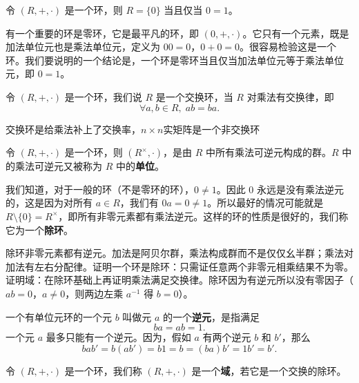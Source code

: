 \begin{proposition}[命题 2.2：零环，加法单位元与乘法单位元相等]
令 $(R,+,\cdot)$ 是一个环，则 $R=\{0\}$ 当且仅当 $0=1$。

有一个重要的环是零环，它是最平凡的环，即 $(0,+,\cdot)$。它只有一个元素，既是加法单位元也是乘法单位元，定义为 $00=0$，$0+0=0$。很容易检验这是一个环。我们要说明的一个结论是，一个环是零环当且仅当加法单位元等于乘法单位元，即 $0=1$。
\end{proposition}

\begin{definition}[定义 2.2：交换环]
令 $(R,+,\cdot)$ 是一个环，我们说 $R$ 是一个交换环，当 $R$ 对乘法有交换律，即
\[
\forall a,b\in R,\;ab=ba.
\]
\end{definition}

\begin{note}[定义2 2交换环]
交换环是给乘法补上了交换率，$n\times n$实矩阵是一个非交换环
\end{note}

\begin{definition}[定义 2.3：单位与除环]
令 $(R,+,\cdot)$ 是一个环，则 $(R^\times,\cdot)$，是由 $R$ 中所有乘法可逆元构成的群。$R$ 中的乘法可逆元又被称为 $R$ 中的\textbf{单位}。

我们知道，对于一般的环（不是零环的环），$0\ne 1$。因此 $0$ 永远是没有乘法逆元的，这是因为对所有 $a\in R$，我们有 $0a=0\ne 1$。所以最好的情况可能就是 $R\setminus\{0\}=R^\times$，即所有非零元素都有乘法逆元。这样的环的性质是很好的，我们称它为一个\textbf{除环}。
\end{definition}

\begin{note}[定义2 4除环非零元素都是单位]
除环非零元素都有逆元。加法是阿贝尔群，乘法构成群而不是仅仅幺半群；乘法对加法有左右分配律。证明一个环是除环：只需证任意两个非零元相乘结果不为零。证明域：在除环基础上再证明乘法满足交换律。除环因为有逆元所以没有零因子（$ab=0$，$a\ne0$，则两边左乘 $a^{-1}$ 得 $b=0$）。
\end{note}

\begin{definition}[环中逆元]
一个有单位元环的一个元 $b$ 叫做元 $a$ 的一个\textbf{逆元}，是指满足
\[
ba=ab=1.
\]
一个元 $a$ 最多只能有一个逆元。因为，假如 $a$ 有两个逆元 $b$ 和 $b'$，那么
\[
bab'=b(ab')=b1=b=(ba)b'=1b'=b'.
\]
\end{definition}

\begin{definition}[定义 2.5：域]
令 $(R,+,\cdot)$ 是一个环，我们称 $(R,+,\cdot)$ 是一个\textbf{域}，若它是一个交换的除环。
\end{definition}


